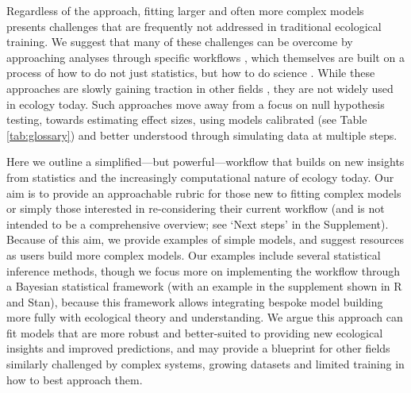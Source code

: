 \documentclass[11pt]{article}
\begin{document}
Regardless of the approach, fitting larger and often more complex models presents challenges that are frequently not addressed in traditional ecological training. We suggest that many of these challenges can be overcome by approaching analyses through specific workflows \citep{betanworkflow,grinsztajn2021,vandeschoot2021}, which themselves are built on a process of how to do not just statistics, but how to do science \citep{box1976science}. While these approaches are slowly gaining traction in other fields \citep[e.g.,][]{esfahani2021bayesian,schad2021,bouman2024bayesian}, they are not widely used in ecology today. Such approaches move away from a focus on null hypothesis testing, towards estimating effect sizes, using models calibrated (see Table \ref{tab:glossary}) and better understood through simulating data at multiple steps. %

Here we outline a simplified---but powerful---workflow that builds on new insights from statistics  \citep{betanworkflow,gelman2020bayesian,vandeschoot2021} and the increasingly computational nature of ecology today. Our aim is to provide an approachable rubric for those new to fitting complex models or simply those interested in re-considering their current workflow (and is not intended to be a comprehensive overview; see `Next steps' in the Supplement). Because of this aim, we provide examples of simple models, and suggest resources as users build more complex models. Our examples include several statistical inference methods, though we focus more on implementing the workflow through a Bayesian statistical framework (with an example in the supplement shown in \textsf{R} and \textsf{Stan}), because this framework allows integrating bespoke model building more fully with ecological theory and understanding. We argue this approach can fit models that are more robust and better-suited to providing new ecological insights and improved predictions, and may provide a blueprint for other fields similarly challenged by complex systems, growing datasets and limited training in how to best approach them. 
\end{document}
